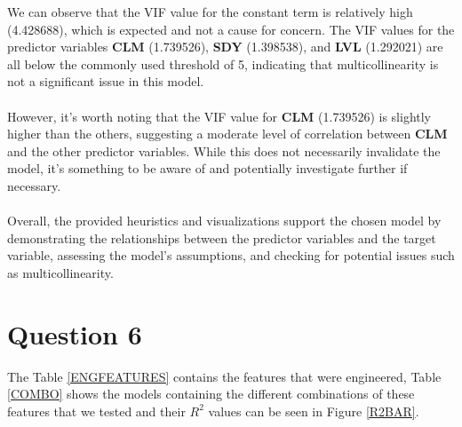 \documentclass{article}
\begin{document}
\noindent We can observe that the VIF value for the constant term is relatively high (4.428688), which is expected and not a cause for concern. The VIF values for the predictor variables \textbf{CLM} (1.739526), \textbf{SDY} (1.398538), and \textbf{LVL} (1.292021) are all below the commonly used threshold of 5, indicating that multicollinearity is not a significant issue in this model.
\\\\
However, it's worth noting that the VIF value for \textbf{CLM} (1.739526) is slightly higher than the others, suggesting a moderate level of correlation between \textbf{CLM} and the other predictor variables. While this does not necessarily invalidate the model, it's something to be aware of and potentially investigate further if necessary.
\\\\
Overall, the provided heuristics and visualizations support the chosen model by demonstrating the relationships between the predictor variables and the target variable, assessing the model's assumptions, and checking for potential issues such as multicollinearity.

\section*{Question 6}

The Table \ref{ENGFEATURES} contains the features that were engineered, Table \ref{COMBO} shows the models containing the different combinations of these features that we tested and their $R^2$ values can be seen in Figure \ref{R2BAR}.
\end{document}
